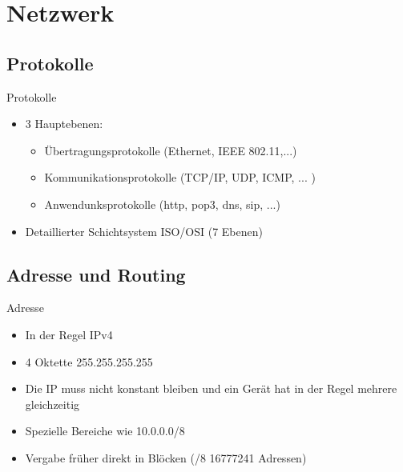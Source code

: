\documentclass[aspectratio=43]{beamer}
\begin{document}
\section{Netzwerk}
\begin{frame} 
\subsection{Protokolle}
	\begin{block}{Protokolle}
	\begin{itemize}
	\item 3 Hauptebenen:
	\begin{itemize}
	\item Übertragungsprotokolle (Ethernet, IEEE 802.11,...)
	\item Kommunikationsprotokolle (TCP/IP, UDP, ICMP, ... )
	\item Anwendunksprotokolle (http, pop3, dns, sip, ...)
	\end{itemize}
	\item Detaillierter Schichtsystem ISO/OSI (7 Ebenen)
	\end{itemize}
	\end{block}
	
\end{frame}
\subsection{Adresse und Routing}
\begin{frame} 

	\begin{block}{Adresse}
	\begin{itemize}
	\item In der Regel IPv4
	\item 4 Oktette 255.255.255.255
	\item Die IP muss nicht konstant bleiben und ein Gerät hat in der Regel mehrere gleichzeitig 
	\item Spezielle Bereiche wie 10.0.0.0/8
	\item Vergabe früher direkt in Blöcken (/8 16777241 Adressen)
	\end{itemize}
	\end{block}
	
\end{frame}
\end{document}
